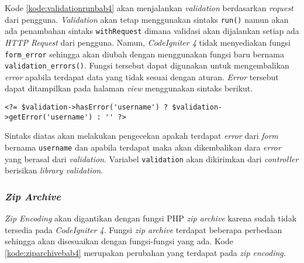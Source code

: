 Kode \ref{kode:validationrunbab4} akan menjalankan \textit{validation} berdasarkan \textit{request} dari pengguna. \textit{Validation} akan tetap menggunakan sintaks \texttt{run()} namun akan ada penambahan sintaks \texttt{withRequest} dimana validasi akan dijalankan setiap ada \textit{HTTP Request} dari pengguna. Namun, \textit{CodeIgniter 4} tidak menyediakan fungsi \texttt{form\_error} sehingga akan diubah dengan menggunakan fungsi baru bernama \texttt{validation\_errors()}. Fungsi tersebut dapat digunakan untuk mengembalikan \textit{error} apabila terdapat data yang tidak sesuai dengan aturan. \textit{Error} tersebut dapat ditampilkan pada halaman \textit{view} menggunakan sintaks berikut.

\begin{center}
\verb|<?= $validation->hasError('username') ? $validation->getError('username') : '' ?>|
\end{center}

Sintaks diatas akan melakukan pengecekan apakah terdapat \textit{error} dari \textit{form} bernama \texttt{username} dan apabila terdapat maka akan dikembalikan dara \textit{error} yang berasal dari \textit{validation}. Variabel \texttt{validation} akan dikirimkan dari \textit{controller} berisikan \textit{library validation}.

\subsubsection{\textit{Zip Archive}}
\textit{Zip Encoding} akan digantikan dengan fungsi PHP \textit{zip archive} karena sudah tidak tersedia pada \textit{CodeIgniter 4}. Fungsi \textit{zip archive} terdapat beberapa perbedaan sehingga akan disesuaikan dengan fungsi-fungsi yang ada. Kode \ref{kode:ziparchivebab4} merupakan perubahan yang terdapat pada \textit{zip encoding}.

